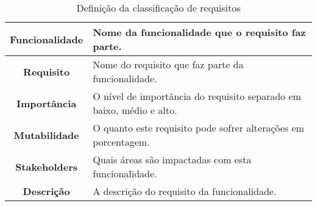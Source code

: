     \begin{table}[h!]
      \centering
      \begin{tabular}{|c|p{10cm}|}
        \hline
        \textbf{Funcionalidade} &
        Nome da funcionalidade que o requisito faz parte. \\ \hline
        \textbf{Requisito} &
        Nome do requisito que faz parte da funcionalidade. \\ \hline
        \textbf{Importância} &
        O nível de importância do requisito separado em baixo, médio e alto. \\ \hline
        \textbf{Mutabilidade} &
        O quanto este requisito pode sofrer alterações em porcentagem. \\ \hline
        \textbf{Stakeholders} &
        Quais áreas são impactadas com esta funcionalidade. \\ \hline
        \textbf{Descrição} &
        A descrição do requisito da funcionalidade. \\ \hline
      \end{tabular}
      \caption{Definição da classificação de requisitos}
      \label{Tabela:4}
    \end{table}

